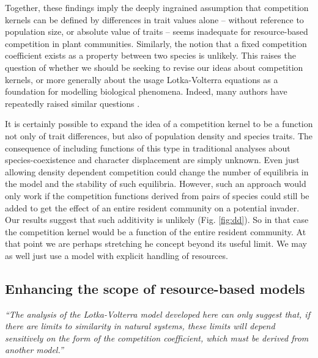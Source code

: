 \documentclass[a4paper,11pt]{article}
\begin{document}
Together, these findings imply the deeply ingrained assumption that
competition kernels can be defined by differences in trait values
alone -- without reference to population size, or absolute value of
traits -- seems inadequate for resource-based competition in plant
communities.
%
Similarly, the notion that a fixed competition coefficient exists as a
property between two species is unlikely. This raises the question of
whether we should be seeking to revise our ideas about competition
kernels, or more generally about the usage Lotka-Volterra equations as
a foundation for modelling biological phenomena.  Indeed, many authors
have repeatedly raised similar questions \citep[e.g.][]{Andrewartha-1953,
  Neill-1974, Abrams-1975, Wangersky-1978,Abrams-1980, Tilman-1987,
  Abrams-2008}.

It is certainly possible to expand the idea of a competition kernel to
be a function not only of trait differences, but also of population
density and species traits. The consequence of including functions of
this type in traditional analyses about species-coexistence and
character displacement are simply unknown.  Even just allowing density
dependent competition could change the number of equilibria in the
model and the stability of such equilibria.
%
However, such an approach would only work if the competition functions
derived from pairs of species could still be added to get the effect
of an entire resident community on a potential invader.
Our results suggest that such additivity is unlikely
(Fig. \ref{fig:dd}). So in that case the competition kernel would be a
function of the entire resident community.  At that point we are
perhaps stretching he concept beyond its useful limit. We may as well
just use a model with explicit handling of resources.

\subsection{Enhancing the scope of resource-based models}

\emph{``The analysis of the Lotka-Volterra model developed here can only
suggest that, if there are limits to similarity in natural systems, these
limits will depend sensitively on the form of the competition coefficient,
which must be derived from another model.''}\citep{Abrams-1975}
\end{document}

